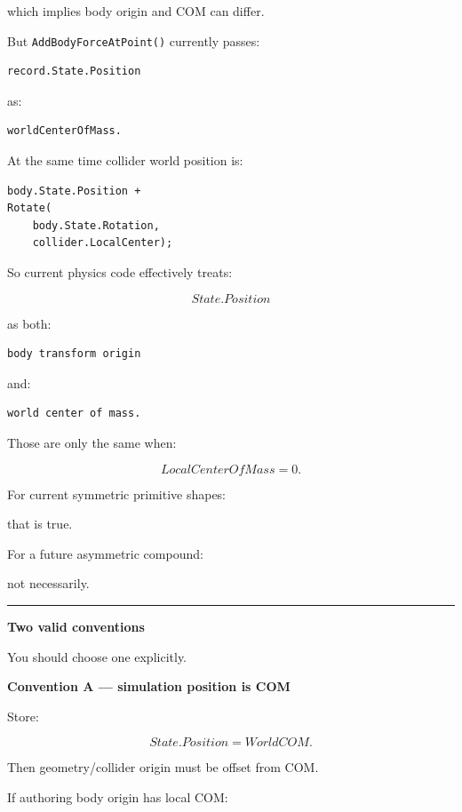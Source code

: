 which implies body origin and COM can differ.

But \texttt{AddBodyForceAtPoint()} currently passes:

\begin{verbatim}
record.State.Position
\end{verbatim}

as:

\begin{verbatim}
worldCenterOfMass.
\end{verbatim}

At the same time collider world position is:

\begin{verbatim}
body.State.Position +
Rotate(
    body.State.Rotation,
    collider.LocalCenter);
\end{verbatim}

So current physics code effectively treats:

\[
State.Position
\]

as both:

\begin{verbatim}
body transform origin
\end{verbatim}

and:

\begin{verbatim}
world center of mass.
\end{verbatim}

Those are only the same when:

\[
LocalCenterOfMass=0.
\]

For current symmetric primitive shapes:

that is true.

For a future asymmetric compound:

not necessarily.

\begin{center}\rule{0.5\linewidth}{0.5pt}\end{center}

\textbf{Two valid conventions}

You should choose one explicitly.

\textbf{Convention A --- simulation position is COM}

Store:

\[
State.Position
=
WorldCOM.
\]

Then geometry/collider origin must be offset from COM.

If authoring body origin has local COM:

